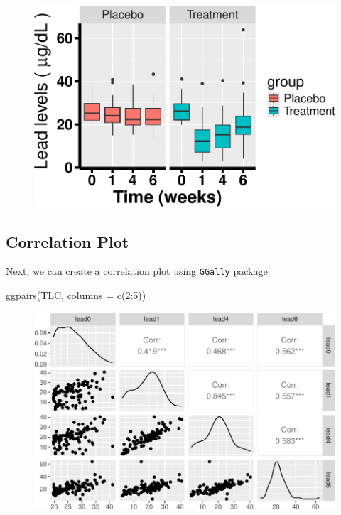 \documentclass[
  letterpaper,
  DIV=11,
  numbers=noendperiod]{scrreprt}
\newenvironment{Shaded}{\begin{snugshade}}{\end{snugshade}}
\newcommand{\AttributeTok}[1]{\textcolor[rgb]{0.40,0.45,0.13}{#1}}
\newcommand{\DecValTok}[1]{\textcolor[rgb]{0.68,0.00,0.00}{#1}}
\newcommand{\FunctionTok}[1]{\textcolor[rgb]{0.28,0.35,0.67}{#1}}
\newcommand{\NormalTok}[1]{\textcolor[rgb]{0.00,0.23,0.31}{#1}}
\newcommand{\SpecialCharTok}[1]{\textcolor[rgb]{0.37,0.37,0.37}{#1}}
\begin{document}
\begin{figure}[H]

{\centering \includegraphics{Longi_EDA_files/figure-pdf/unnamed-chunk-10-1.pdf}

}

\end{figure}

\hypertarget{correlation-plot}{%
\subsection{Correlation Plot}\label{correlation-plot}}

Next, we can create a correlation plot using \texttt{GGally} package.

\begin{Shaded}
\begin{Highlighting}[]
\FunctionTok{ggpairs}\NormalTok{(TLC, }\AttributeTok{columns =} \FunctionTok{c}\NormalTok{(}\DecValTok{2}\SpecialCharTok{:}\DecValTok{5}\NormalTok{))}
\end{Highlighting}
\end{Shaded}

\begin{figure}[H]

{\centering \includegraphics{Longi_EDA_files/figure-pdf/unnamed-chunk-11-1.pdf}

}

\end{figure}
\end{document}
